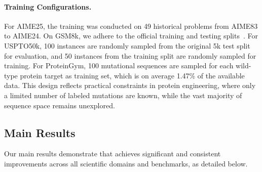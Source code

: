 \paragraph{Training Configurations.}%
For AIME25, the training was conducted on 49 historical problems from AIME83 to AIME24. On GSM8k, we adhere to the official training and testing splits~\cite{cobbe2021gsm8k}. For USPTO50k, 100 instances are randomly sampled from the original 5k test split for evaluation, and 50 instances from the training split are randomly sampled for training. For ProteinGym, 100 mutational sequences are sampled for each wild-type protein target as training set, which is on average 1.47\% of the available data. This design reflects practical constraints in protein engineering, where only a limited number of labeled mutations are known, while the vast majority of sequence space remains unexplored. %

\subsection{Main Results}
Our main results demonstrate that \method{} achieves significant and consistent improvements across all scientific domains and benchmarks, as detailed below.


